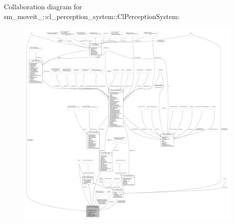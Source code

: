 Collaboration diagram for sm\+\_\+moveit\+\_\+:\+:cl\+\_\+perception\+\_\+system\+:\+:Cl\+Perception\+System\+:
\nopagebreak
\begin{figure}[H]
\begin{center}
\leavevmode
\includegraphics[width=350pt]{classsm__moveit__2_1_1cl__perception__system_1_1ClPerceptionSystem__coll__graph}
\end{center}
\end{figure}
